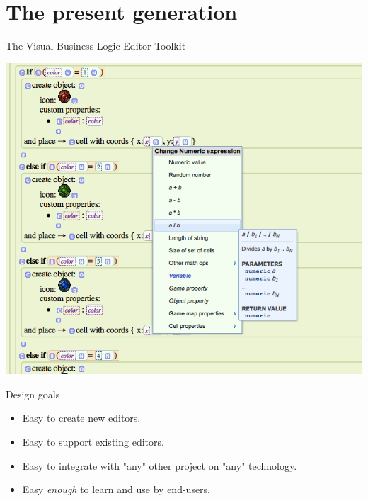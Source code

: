 \documentclass[handout]{beamer}
\begin{document}

\section{The present generation}


\begin{frame}{The Visual Business Logic Editor Toolkit}

\includegraphics[height=.8\textheight]{gamector}

\end{frame}


\begin{frame}{Design goals}

\begin{itemize}
\item Easy to create new editors.
\item Easy to support existing editors.
\item Easy to integrate with "any" other project on "any" technology.
\item Easy \textit{enough} to learn and use by end-users.
\end{itemize}

\end{frame}
\end{document}
